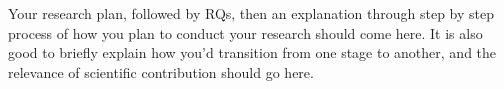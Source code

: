 Your research plan, followed by RQs, then an explanation through step by step process of how you plan to conduct your research should come here. It is also good to briefly explain how you'd transition from one stage to another, and the relevance of scientific contribution should go here.